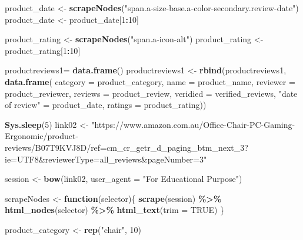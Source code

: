 \documentclass[
]{article}
\newenvironment{Shaded}{\begin{snugshade}}{\end{snugshade}}
\newcommand{\AttributeTok}[1]{\textcolor[rgb]{0.13,0.29,0.53}{#1}}
\newcommand{\ConstantTok}[1]{\textcolor[rgb]{0.56,0.35,0.01}{#1}}
\newcommand{\ControlFlowTok}[1]{\textcolor[rgb]{0.13,0.29,0.53}{\textbf{#1}}}
\newcommand{\DecValTok}[1]{\textcolor[rgb]{0.00,0.00,0.81}{#1}}
\newcommand{\FunctionTok}[1]{\textcolor[rgb]{0.13,0.29,0.53}{\textbf{#1}}}
\newcommand{\NormalTok}[1]{#1}
\newcommand{\OtherTok}[1]{\textcolor[rgb]{0.56,0.35,0.01}{#1}}
\newcommand{\SpecialCharTok}[1]{\textcolor[rgb]{0.81,0.36,0.00}{\textbf{#1}}}
\newcommand{\StringTok}[1]{\textcolor[rgb]{0.31,0.60,0.02}{#1}}
\begin{document}
\begin{Shaded}
\begin{Highlighting}[]
\NormalTok{  product\_date }\OtherTok{\textless{}{-}} \FunctionTok{scrapeNodes}\NormalTok{(}\StringTok{"span.a{-}size{-}base.a{-}color{-}secondary.review{-}date"}\NormalTok{)}
\NormalTok{  product\_date }\OtherTok{\textless{}{-}}\NormalTok{ product\_date[}\DecValTok{1}\SpecialCharTok{:}\DecValTok{10}\NormalTok{]}
  
\NormalTok{  product\_rating }\OtherTok{\textless{}{-}} \FunctionTok{scrapeNodes}\NormalTok{(}\StringTok{"span.a{-}icon{-}alt"}\NormalTok{)}
\NormalTok{  product\_rating }\OtherTok{\textless{}{-}}\NormalTok{ product\_rating[}\DecValTok{1}\SpecialCharTok{:}\DecValTok{10}\NormalTok{]}
  
\NormalTok{  productreviews1}\OtherTok{=} \FunctionTok{data.frame}\NormalTok{()}
\NormalTok{  productreviews1 }\OtherTok{\textless{}{-}} \FunctionTok{rbind}\NormalTok{(productreviews1, }\FunctionTok{data.frame}\NormalTok{(}
                      \AttributeTok{category =}\NormalTok{ product\_category,}
                      \AttributeTok{name =}\NormalTok{ product\_name,}
                      \AttributeTok{reviewer =}\NormalTok{ product\_reviewer,}
                      \AttributeTok{reviews =}\NormalTok{ product\_review,}
                      \AttributeTok{veridied =}\NormalTok{ verified\_reviews,}
                      \StringTok{"date of review"} \OtherTok{=}\NormalTok{ product\_date,}
                      \AttributeTok{ratings =}\NormalTok{ product\_rating))}

  
 \FunctionTok{Sys.sleep}\NormalTok{(}\DecValTok{5}\NormalTok{)}
\NormalTok{link02 }\OtherTok{\textless{}{-}} \StringTok{"https://www.amazon.com.au/Office{-}Chair{-}PC{-}Gaming{-}Ergonomic/product{-}reviews/B07T9KVJ8D/ref=cm\_cr\_getr\_d\_paging\_btm\_next\_3?ie=UTF8\&reviewerType=all\_reviews\&pageNumber=3"}


\NormalTok{  session }\OtherTok{\textless{}{-}} \FunctionTok{bow}\NormalTok{(link02,}
               \AttributeTok{user\_agent =} \StringTok{"For Educational Purpose"}\NormalTok{)}

\NormalTok{  scrapeNodes }\OtherTok{\textless{}{-}} \ControlFlowTok{function}\NormalTok{(selector)\{}
    \FunctionTok{scrape}\NormalTok{(session) }\SpecialCharTok{\%\textgreater{}\%}
      \FunctionTok{html\_nodes}\NormalTok{(selector) }\SpecialCharTok{\%\textgreater{}\%}
      \FunctionTok{html\_text}\NormalTok{(}\AttributeTok{trim =} \ConstantTok{TRUE}\NormalTok{)}
\NormalTok{  \}}

\NormalTok{  product\_category }\OtherTok{\textless{}{-}} \FunctionTok{rep}\NormalTok{(}\StringTok{"chair"}\NormalTok{, }\DecValTok{10}\NormalTok{)}


\end{Highlighting}
\end{Shaded}
\end{document}
